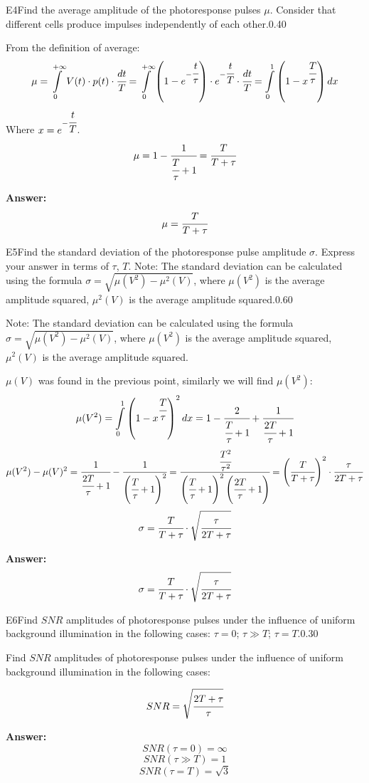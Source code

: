 \documentclass[11pt,a4paper]{article}
\begin{document}
\begin{solcard}{E4}{Find the average amplitude of the photoresponse pulses $\mu$. Consider that different cells produce impulses independently of each other.}{0.40}

From the definition of average: $$\mu = \int\limits_0^{+\infty} V(t)\cdot p(t) \cdot \cfrac{dt}{T} = \int\limits_0^{+\infty} \left(1 - e^{-\cfrac{t}{\tau}}\right)\cdot e^{-\cfrac{t}{T}} \cdot \cfrac{dt}{T} = \int\limits_0^1 \left(1 - x^{\cfrac{T}{\tau}}\right)dx$$Where $x = e^{-\cfrac{t}{T}}$. $$\mu = 1 - \cfrac{1}{\cfrac{T}{\tau} +1} = \cfrac{T}{T + \tau}$$

\par\smallskip\noindent\textbf{Answer:} $$\mu = \cfrac{T}{T + \tau}$$
\end{solcard}

\begin{solcard}{E5}{Find the standard deviation of the photoresponse pulse amplitude $\sigma$. Express your answer in terms of $\tau$, $T$. Note: The standard deviation can be calculated using the formula $\sigma=\sqrt{\mu(V^2)-\mu^2(V)}$, where $\mu(V^2)$ is the average amplitude squared, $\mu^2(V)$ is the average amplitude squared.}{0.60}

Note: The standard deviation can be calculated using the formula $\sigma=\sqrt{\mu(V^2)-\mu^2(V)}$, where $\mu(V^2)$ is the average amplitude squared, $\mu^2(V)$ is the average amplitude squared.


$\mu(V)$ was found in the previous point, similarly we will find $\mu(V^2)$: $$\mu(V^2) = \int\limits_0^1\left(1 - x^{\cfrac{T}{\tau}}\right)^2dx = 1 - \cfrac{2}{\cfrac{T}{\tau}+1} + \cfrac{1}{\cfrac{2T}{\tau}+1}$$$$\mu(V^2) - \mu(V)^2 = \cfrac{1}{\cfrac{2T}{\tau}+1} - \cfrac{1}{\left(\cfrac{T}{\tau}+1\right)^2} = \cfrac{\cfrac{T^2}{\tau^2}}{\left(\cfrac{T}{\tau}+1\right)^2\left(\cfrac{2T}{\tau}+1\right)} = \left(\cfrac{T}{T+\tau}\right)^2\cdot\cfrac{\tau}{2T+\tau}$$$$\sigma = \cfrac{T}{T+\tau}\cdot\sqrt{\cfrac{\tau}{2T + \tau}}$$

\par\smallskip\noindent\textbf{Answer:} $$\sigma = \cfrac{T}{T+\tau}\cdot\sqrt{\cfrac{\tau}{2T + \tau}}$$
\end{solcard}

\begin{solcard}{E6}{Find $SNR$ amplitudes of photoresponse pulses under the influence of uniform background illumination in the following cases: $\tau=0$; $\tau\gg{T}$; $\tau=T$.}{0.30}

Find $SNR$ amplitudes of photoresponse pulses under the influence of uniform background illumination in the following cases:


$$SNR = \sqrt{\cfrac{2T + \tau}{\tau}}$$

\par\smallskip\noindent\textbf{Answer:} $$SNR(\tau = 0) = \infty$$$$SNR(\tau \gg T) = 1$$$$SNR(\tau = T) = \sqrt{3}$$
\end{solcard}
\end{document}
